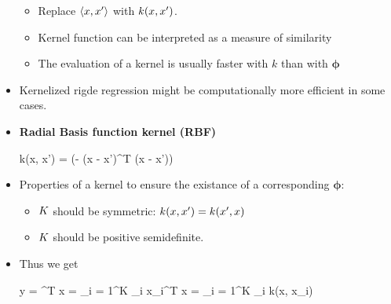 \begin{itemize}
\begin{itemize}
		\item Replace $\langle \*x, \*x' \rangle$ with $k(\*x, \*x')$.
		\item Kernel function can be interpreted as a measure of similarity
		\item The evaluation of a kernel is usually faster with $k$ than with $\bm \phi$
	\end{itemize}
	\item Kernelized rigde regression might be computationally more efficient in some cases.
	\item \textbf{Radial Basis function kernel (RBF)}
	\begin{myalign*}
	     k(\*x, \*x') = \exp(- (\*x - \*x')^T (\*x - \*x'))
	 \end{myalign*} 
	\item Properties of a kernel to ensure the existance of a corresponding $\bm \phi$:
	\begin{itemize}
		\item $\*K$ should be symmetric: $k(\*x, \*x') = k(\*x', \*x)$
		\item $\* K$ should be positive semidefinite.
	\end{itemize}
	\item Thus we get
	\begin{myalign*}
	    \*y = \bm \beta^T \*x = \sum_{i = 1}^K \alpha_i \*x_i^T \*x = \sum_{i = 1}^K \alpha_i k(\*x, \*x_i) 
	\end{myalign*}
\end{itemize}



